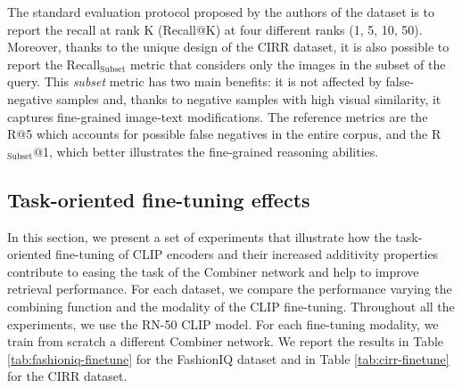 \documentclass[acmlarge]{acmart}
\begin{document}
The standard evaluation protocol proposed by the authors of the dataset is to report the recall at rank K (Recall@K) at four different ranks (1, 5, 10, 50). Moreover, thanks to the unique design of the CIRR dataset, it is also possible to report the Recall$_\text{Subset}$ metric that considers only the images in the subset of the query. This \emph{subset} metric has two main benefits: it is not affected by false-negative samples and, thanks to negative samples with high visual similarity, it captures fine-grained image-text modifications.
The reference metrics are the R@5 which accounts for possible false negatives in the entire corpus, and the R$_\text{Subset}$@1, which better illustrates the fine-grained reasoning abilities.



\subsection{Task-oriented fine-tuning effects} \label{sec:fine-tuning}
In this section, we present a set of experiments that illustrate how the task-oriented fine-tuning of CLIP encoders and their increased additivity properties contribute to easing the task of the Combiner network and help to improve retrieval performance.
For each dataset, we compare the performance varying the combining function and the modality of the CLIP fine-tuning.
Throughout all the experiments, we use the RN-50 CLIP model. For each fine-tuning modality, we train from scratch a different Combiner network.
We report the results in Table \ref{tab:fashioniq-finetune} for the FashionIQ dataset and in Table \ref{tab:cirr-finetune} for the CIRR dataset. 
\end{document}
